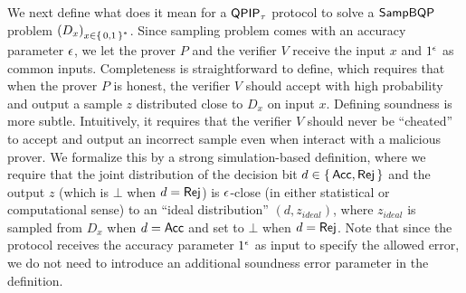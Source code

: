 We next define what does it mean for a $\operatorname{\mathsf{QPIP}}_\tau$ protocol to solve a $\operatorname{\mathsf{SampBQP}}$ problem $\left(D_x\right)_{x\in\set{0, 1}^*}$.
Since sampling problem comes with an accuracy parameter $\epsilon$, we let the prover $P$ and the verifier $V$ receive the input $x$ and $1^\epsilon$ as common inputs. 
Completeness is straightforward to define, which requires that when the prover $P$ is honest, the verifier $V$ should accept with high probability and output a sample $z$ distributed close to $D_x$ on input $x$. Defining soundness is more subtle. Intuitively, it requires that the verifier $V$ should never be ``cheated'' to accept and output an incorrect sample even when interact with a malicious prover. We formalize this by a strong simulation-based definition, where we require that the joint distribution of the decision bit $d \in \set{\mathsf{Acc}, \mathsf{Rej}}$ and the output $z$ (which is $\bot$ when $d = \mathsf{Rej}$) is $\epsilon$-close (in either statistical or computational sense) to an ``ideal distribution'' $(d,z_{ideal})$, where $z_{ideal}$ is sampled from $D_x$ when $d = \mathsf{Acc}$ and set to $\bot$ when $d = \mathsf{Rej}$. Note that since the protocol receives the accuracy parameter $1^{\epsilon}$ as input to specify the allowed error, we do not need to introduce an additional soundness error parameter in the definition.







